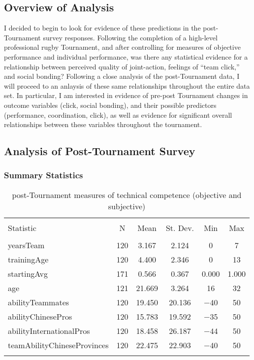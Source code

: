 \documentclass[12pt]{report}
\begin{document}
\subsection{Overview of Analysis}
I decided to begin to look for evidence of these predictions in the post-Tournament survey responses.  Following the completion of a high-level professional rugby Tournament, and after controlling for measures of objective performance and individual performance, was there any statistical evidence for a relationship between perceived quality of joint-action, feelings of ``team click,'' and social bonding?  Following a close analysis of the post-Tournament data, I will proceed to an anlaysis of these same relationships throughout the entire data set.  In particular, I am interested in evidence of pre-post Tournament changes in outcome variables (click, social bonding), and their possible predictors (performance, coordination, click), as well as evidence for significant overall relationships between these variables throughout the tournament.

\subsection{Analysis of Post-Tournament Survey}


\subsubsection{Summary Statistics}
\begin{table}[!htbp] \centering
  \caption{post-Tournament measures of technical competence (objective and subjective)}
  \label{}
\begin{tabular}{@{\extracolsep{5pt}}lccccc}
\\[-1.8ex]\hline
\hline \\[-1.8ex]
Statistic & \multicolumn{1}{c}{N} & \multicolumn{1}{c}{Mean} & \multicolumn{1}{c}{St. Dev.} & \multicolumn{1}{c}{Min} & \multicolumn{1}{c}{Max} \\
\hline \\[-1.8ex]
yearsTeam & 120 & 3.167 & 2.124 & 0 & 7 \\
trainingAge & 120 & 4.400 & 2.346 & 0 & 13 \\
startingAvg & 171 & 0.566 & 0.367 & 0.000 & 1.000 \\
age & 121 & 21.669 & 3.264 & 16 & 32 \\
abilityTeammates & 120 & 19.450 & 20.136 & $-$40 & 50 \\
abilityChinesePros & 120 & 15.783 & 19.592 & $-$35 & 50 \\
abilityInternationalPros & 120 & 18.458 & 26.187 & $-$44 & 50 \\
teamAbilityChineseProvinces & 120 & 22.475 & 22.903 & $-$40 & 50 \\
\hline \\[-1.8ex]
\end{tabular}
\end{table}
\end{document}
